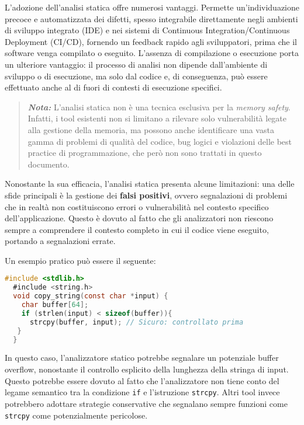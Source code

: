 L'adozione dell'analisi statica offre numerosi vantaggi. Permette un'individuazione
precoce e automatizzata dei difetti, spesso integrabile direttamente negli
ambienti di sviluppo integrato (IDE) e nei sistemi di Continuous Integration/Continuous
Deployment (CI/CD), fornendo un feedback rapido agli sviluppatori, prima che il
software venga compilato o eseguito. L'assenza di compilazione o esecuzione porta
un ulteriore vantaggio: il processo di analisi non dipende dall'ambiente di
sviluppo o di esecuzione, ma solo dal codice e, di conseguenza, può essere effettuato
anche al di fuori di contesti di esecuzione specifici.

\begin{quote}
  \textbf{\textit{Nota:}} L'analisi statica non è una tecnica esclusiva per la
  \textit{memory safety}. Infatti, i tool esistenti non si limitano a rilevare solo
  vulnerabilità legate alla gestione della memoria, ma possono anche
  identificare una vasta gamma di problemi di qualità del codice, bug logici e violazioni
  delle best practice di programmazione, che però non sono trattati in questo
  documento.
\end{quote}

\noindent
Nonostante la sua efficacia, l'analisi statica presenta alcune limitazioni: una
delle sfide principali è la gestione dei \textbf{falsi positivi}, ovvero
segnalazioni di problemi che in realtà non costituiscono errori o vulnerabilità
nel contesto specifico dell'applicazione. Questo è dovuto al fatto che gli analizzatori
non riescono sempre a comprendere il contesto completo in cui il codice viene eseguito,
portando a segnalazioni errate.

Un esempio pratico può essere il seguente:

\begin{lstlisting}[language=C]
  #include <stdlib.h>
  #include <string.h>
  void copy_string(const char *input) {
    char buffer[64];
    if (strlen(input) < sizeof(buffer)){
      strcpy(buffer, input); // Sicuro: controllato prima
   }
  }
\end{lstlisting}

In questo caso, l'analizzatore statico potrebbe segnalare un potenziale buffer
overflow, nonostante il controllo esplicito della lunghezza della stringa di input.
Questo potrebbe essere dovuto al fatto che l'analizzatore non tiene conto del
legame semantico tra la condizione \texttt{if} e l'istruzione \texttt{strcpy}. Altri
tool invece potrebbero adottare strategie conservative che segnalano sempre funzioni
come \texttt{strcpy} come potenzialmente pericolose.

